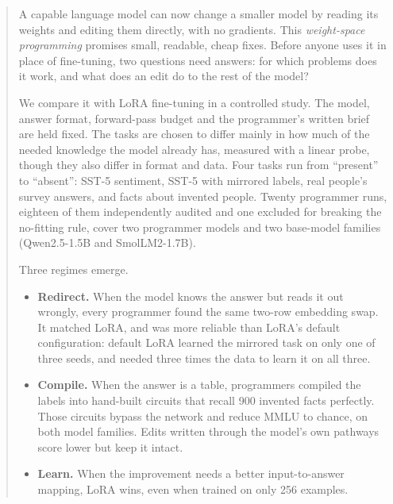 \begin{abstract}
A capable language model can now change a smaller model by reading its weights and editing them directly, with no gradients. This \emph{weight-space programming} promises small, readable, cheap fixes. Before anyone uses it in place of fine-tuning, two questions need answers: for which problems does it work, and what does an edit do to the rest of the model?

We compare it with LoRA fine-tuning in a controlled study. The model, answer format, forward-pass budget and the programmer's written brief are held fixed. The tasks are chosen to differ mainly in how much of the needed knowledge the model already has, measured with a linear probe, though they also differ in format and data. Four tasks run from ``present'' to ``absent'': SST-5 sentiment, SST-5 with mirrored labels, real people's survey answers, and facts about invented people. Twenty programmer runs, eighteen of them independently audited and one excluded for breaking the no-fitting rule, cover two programmer models and two base-model families (Qwen2.5-1.5B and SmolLM2-1.7B).

Three regimes emerge.
\begin{itemize}
  \item \textbf{Redirect.} When the model knows the answer but reads it out wrongly, every programmer found the same two-row embedding swap. It matched LoRA, and was more reliable than LoRA's default configuration: default LoRA learned the mirrored task on only one of three seeds, and needed three times the data to learn it on all three.
  \item \textbf{Compile.} When the answer is a table, programmers compiled the labels into hand-built circuits that recall 900 invented facts perfectly. Those circuits bypass the network and reduce MMLU to chance, on both model families. Edits written through the model's own pathways score lower but keep it intact.
  \item \textbf{Learn.} When the improvement needs a better input-to-answer mapping, LoRA wins, even when trained on only 256 examples.
\end{itemize}


\end{abstract}
